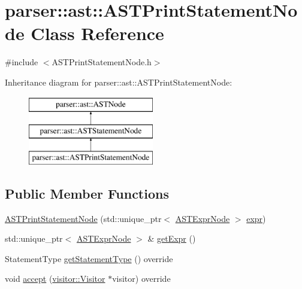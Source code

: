 \hypertarget{classparser_1_1ast_1_1ASTPrintStatementNode}{}\section{parser\+:\+:ast\+:\+:A\+S\+T\+Print\+Statement\+Node Class Reference}
\label{classparser_1_1ast_1_1ASTPrintStatementNode}


{\ttfamily \#include $<$A\+S\+T\+Print\+Statement\+Node.\+h$>$}

Inheritance diagram for parser\+:\+:ast\+:\+:A\+S\+T\+Print\+Statement\+Node\+:\begin{figure}[H]
\begin{center}
\leavevmode
\includegraphics[height=3.000000cm]{d0/d40/classparser_1_1ast_1_1ASTPrintStatementNode}
\end{center}
\end{figure}
\subsection*{Public Member Functions}
\begin{DoxyCompactItemize}
\item 
\hyperlink{classparser_1_1ast_1_1ASTPrintStatementNode_a078c63cee6196eb39232a1004614f2f2}{A\+S\+T\+Print\+Statement\+Node} (std\+::unique\+\_\+ptr$<$ \hyperlink{classparser_1_1ast_1_1ASTExprNode}{A\+S\+T\+Expr\+Node} $>$ \hyperlink{classparser_1_1ast_1_1ASTPrintStatementNode_a6e7ab83be122fb4f6428b5222faf7169}{expr})
\item 
std\+::unique\+\_\+ptr$<$ \hyperlink{classparser_1_1ast_1_1ASTExprNode}{A\+S\+T\+Expr\+Node} $>$ \& \hyperlink{classparser_1_1ast_1_1ASTPrintStatementNode_a4e244a1d7f8c390c6772c2f2bab863a2}{get\+Expr} ()
\item 
Statement\+Type \hyperlink{classparser_1_1ast_1_1ASTPrintStatementNode_a9526c5de33100e05f1ccba710c0a9a34}{get\+Statement\+Type} () override
\item 
void \hyperlink{classparser_1_1ast_1_1ASTPrintStatementNode_a15199624d689c55bd6d027132d2a9a64}{accept} (\hyperlink{classvisitor_1_1Visitor}{visitor\+::\+Visitor} $\ast$visitor) override
\end{DoxyCompactItemize}
